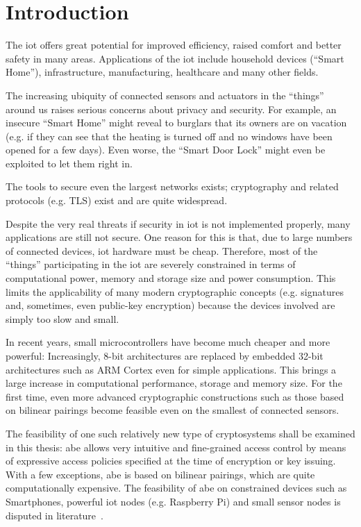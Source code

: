
\chapter{Introduction}\label{chapter:introduction}

The \acrfull{iot} offers great potential for improved efficiency, raised comfort and better safety in many areas. %
Applications of the \acrshort{iot} include household devices (``Smart Home''), infrastructure, manufacturing, healthcare and many other fields.

The increasing ubiquity of connected sensors and actuators in the ``things'' around us raises serious concerns about privacy and security.
For example, an insecure ``Smart Home'' might reveal to burglars that its owners are on vacation (e.g. if they can see that the heating is turned off and no windows have been opened for a few days).
Even worse, the ``Smart Door Lock'' might even be exploited to let them right in.

The tools to secure even the largest networks exists; cryptography and related protocols (e.g. TLS) exist and are quite widespread.

Despite the very real threats if security in \acrshort{iot} is not implemented properly, many applications are still not secure. 
One reason for this is that, due to large numbers of connected devices, \acrshort{iot} hardware must be cheap.
Therefore, most of the ``things'' participating in the \acrshort{iot} are severely constrained in terms of computational power, memory and storage size and power consumption. 
This limits the applicability of many modern cryptographic concepts (e.g. signatures and, sometimes, even public-key encryption) because the devices involved are simply too slow and small.

In recent years, small microcontrollers have become much cheaper and more powerful: 
Increasingly, 8-bit architectures are replaced by embedded 32-bit architectures such as ARM Cortex even for simple applications. %
This brings a large increase in computational performance, storage and memory size.
For the first time, even more advanced cryptographic constructions such as those based on bilinear pairings become feasible even on the smallest of connected sensors.

The feasibility of one such relatively new type of cryptosystems shall be examined in this thesis: 
\acrfull{abe} allows very intuitive and fine-grained access control by means of expressive access policies specified at the time of encryption or key issuing.
With a few exceptions, \acrshort{abe} is based on bilinear pairings, which are quite computationally expensive.
The feasibility of \acrshort{abe} on constrained devices such as Smartphones, powerful \acrshort{iot} nodes (e.g. Raspberry Pi) and small sensor nodes is disputed in literature~\cite{wang_performance_2014,ambrosin_feasibility_2016,ambrosin_feasibility_2015,girgenti_feasibility_2019,borgh_attribute-based_2016}.


